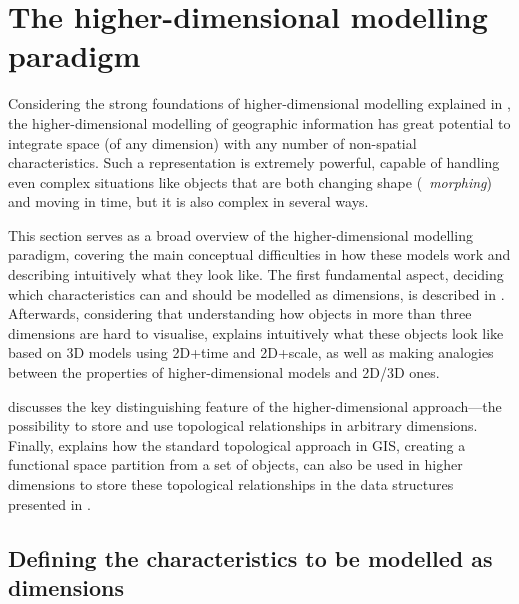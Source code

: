 \section{The higher-dimensional modelling paradigm}
\label{se:nd-modelling-paradigm}

Considering the strong foundations of higher-dimensional modelling explained in , the higher-dimensional modelling of geographic information has great potential to integrate space (of any dimension) with any number of non-spatial characteristics.
Such a representation is extremely powerful, capable of handling even complex situations like objects that are both changing shape (\ie\ \emph{morphing}) and moving in time, but it is also complex in several ways.

This section serves as a broad overview of the higher-dimensional modelling paradigm, covering the main conceptual difficulties in how these models work and describing intuitively what they look like.
The first fundamental aspect, deciding which characteristics can and should be modelled as dimensions, is described in .
Afterwards, considering that understanding how objects in more than three dimensions are hard to visualise,  explains intuitively what these objects look like based on 3D models using 2D+time and 2D+scale, as well as making analogies between the properties of higher-dimensional models and 2D/3D ones.

 discusses the key distinguishing feature of the higher-dimensional approach---the possibility to store and use topological relationships in arbitrary dimensions.
Finally,  explains how the standard topological approach in GIS, creating a functional space partition from a set of objects, can also be used in higher dimensions to store these topological relationships in the data structures presented in .

\subsection{Defining the characteristics to be modelled as dimensions}
\label{ss:dimensions}

